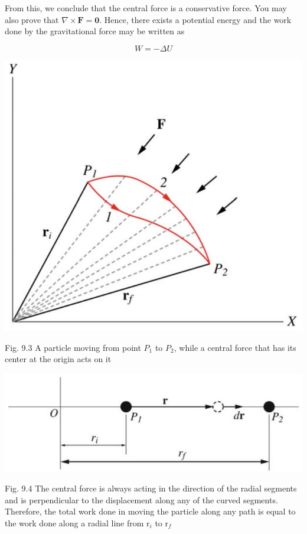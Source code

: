 \documentclass[10pt]{article}
\begin{document}
From this, we conclude that the central force is a conservative force. You may also prove that $\nabla \times \mathbf{F}=\mathbf{0}$. Hence, there exists a potential energy and the work done by the gravitational force may be written as

$$
W=-\Delta U
$$

\begin{center}
\includegraphics[max width=\textwidth]{2024_09_13_db1f357d2aad0a03eb2eg-144(1)}
\end{center}

Fig. 9.3 A particle moving from point $P_{1}$ to $P_{2}$, while a central force that has its center at the origin acts on it

\begin{center}
\includegraphics[max width=\textwidth]{2024_09_13_db1f357d2aad0a03eb2eg-144}
\end{center}

Fig. 9.4 The central force is always acting in the direction of the radial segments and is perpendicular to the displacement along any of the curved segments. Therefore, the total work done in moving the particle along any path is equal to the work done along a radial line from $\mathrm{r}_{i}$ to $\mathrm{r}_{f}$
\end{document}

